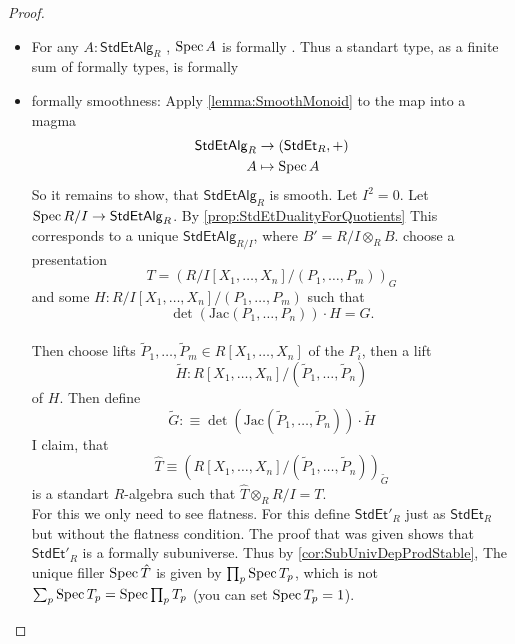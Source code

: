 \begin{proof}
	\begin{itemize}
		\item For any $A : \mathsf{StdEtAlg}_R$ , $\operatorname{Spec} A$ is formally \etale \todocite. Thus a standart \etale type, as a finite sum of formally \etale types, is formally \etale
		\item formally smoothness: Apply \ref{lemma:SmoothMonoid} to the map into a magma
		\begin{align*}
			 \mathsf{StdEtAlg}_R &\to (\mathsf{StdEt}_R , +) \\
			 A &\mapsto \operatorname{Spec} A
		\end{align*}
		So it remains to show, that $\mathsf{StdEtAlg}_R$ is smooth.			
		Let $I^2 = 0$.
		Let $\operatorname{Spec}  R/ I \to \mathsf{StdEtAlg}_{R}$. By \ref{prop:StdEtDualityForQuotients} This corresponds to a unique $\mathsf{StdEtAlg}_{R/I}$, where $B' = R / I \otimes_R B$. choose a presentation
		\[
		T = \left (R/I[X_1,\hdots,X_n] / (P_1,\hdots,P_m) \right)_G
		\]
		and some $H : R/I[X_1,\hdots,X_n] / (P_1,\hdots,P_m)$ such that  
		\[\det (\mathrm{Jac}(P_1,\hdots,P_n)) \cdot H = G.\] \\
		Then choose lifts $\tilde P_1, \hdots, \tilde P_m \in R[X_1,\hdots,X_n]$ of the $P_i$, then a lift 
		\[\tilde H : R[X_1,\hdots,X_n] / (\tilde P_1 , \hdots, \tilde P_n)\]
		of $H$. Then define 
		\[
		\tilde G :\equiv \det (\mathrm{Jac}(\tilde P_1,\hdots, \tilde P_n)) \cdot \tilde H
		\]
		I claim, that
		\[\hat T \equiv \left(R[X_1,\hdots,X_n]  / (\tilde P_1,\hdots,\tilde P_n) \right)_{\tilde G} \]
		is a standart \etale $R$-algebra such that $\hat T \otimes_R R/ I = T$. \\
		For this we only need to see flatness. For this define $\mathsf{StdEt'}_R$ just as $\mathsf{StdEt}_R$ but without the flatness condition. The proof that was given shows that $\mathsf{StdEt'}_R$ is a formally \etale subuniverse. Thus by \ref{cor:SubUnivDepProdStable}, The unique filler $\operatorname{Spec} \hat T$ is given by $\prod_p \operatorname{Spec} T_p$, which is not $\sum_p \operatorname{Spec} T_p = \operatorname{Spec} \prod_p T_p$ (you can set $\operatorname{Spec} T_p = 1$).
		
		
		

\end{itemize}
\end{proof}
